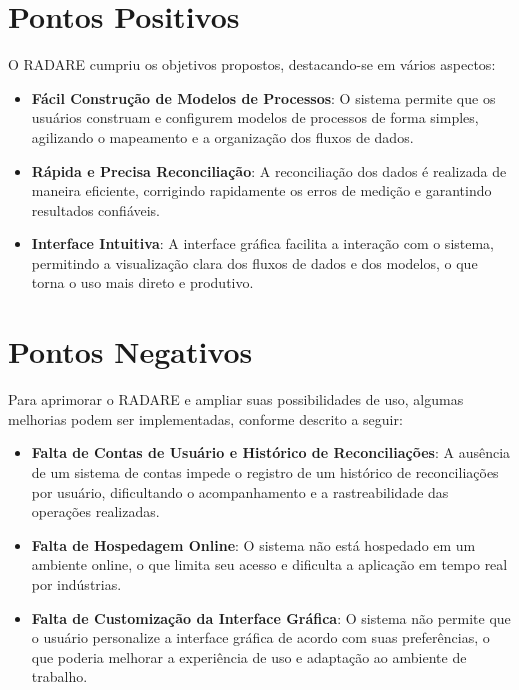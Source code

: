 \label{Cap:Conclusao}

\section{Pontos Positivos}

O RADARE cumpriu os objetivos propostos, destacando-se em vários aspectos:

\begin{itemize}
    \item \textbf{Fácil Construção de Modelos de Processos}: O sistema permite que os usuários construam e configurem modelos de processos de forma simples, agilizando o mapeamento e a organização dos fluxos de dados.

    \item \textbf{Rápida e Precisa Reconciliação}: A reconciliação dos dados é realizada de maneira eficiente, corrigindo rapidamente os erros de medição e garantindo resultados confiáveis.

    \item \textbf{Interface Intuitiva}: A interface gráfica facilita a interação com o sistema, permitindo a visualização clara dos fluxos de dados e dos modelos, o que torna o uso mais direto e produtivo.
\end{itemize}

\section{Pontos Negativos}

Para aprimorar o RADARE e ampliar suas possibilidades de uso, algumas melhorias podem ser implementadas, conforme descrito a seguir:

\begin{itemize}
    \item \textbf{Falta de Contas de Usuário e Histórico de Reconciliações}: A ausência de um sistema de contas impede o registro de um histórico de reconciliações por usuário, dificultando o acompanhamento e a rastreabilidade das operações realizadas.

    \item \textbf{Falta de Hospedagem Online}: O sistema não está hospedado em um ambiente online, o que limita seu acesso e dificulta a aplicação em tempo real por indústrias.

    \item \textbf{Falta de Customização da Interface Gráfica}: O sistema não permite que o usuário personalize a interface gráfica de acordo com suas preferências, o que poderia melhorar a experiência de uso e adaptação ao ambiente de trabalho.
\end{itemize}

